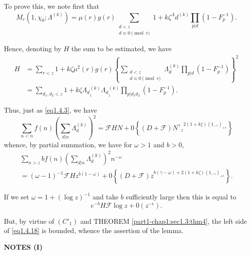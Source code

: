 To prove this, we note first that 
$$
M_r (1, \chi_0 ; \Lambda^{(k)}) = \mu (r) g (r)
\sum_{\substack{d < z \\ d \equiv 0 \pmod{r}}} 1+k \zeta
^{\Lambda}d ^{(k)} \prod_{p|d} (1-F_p ^{-1}). 
$$

Hence, denoting by $H$ the sum to be estimated, we have
\begin{align*}
  H & = \sum_{r < z} 1+k \zeta \mu^2 (r) g (r) \left\{
  \sum_{\substack{d < z \\ d \equiv 0 \pmod{r}}} \Lambda^{(k)}_d
  \prod_{p|d} (1-F_p^{-1})\right\}^2\\ 
  &= \sum_{d_1,d_2 < z} 1+k \zeta \Lambda{_d}_{_1}^{(k)}
  \Lambda{_d}_{_1}^{(k)} \prod_{p|d_1d_2} (1-F_p^{-1}). 
\end{align*}\pageoriginale

Thus, just as \eqref{eq1.4.3}, we have
$$
\sum_{n < n} f(n) \left(\sum_{d|n} \Lambda_d^{(k)}\right)^2 = \mathscr{F} HN + 0
\left\{ (D+\mathscr{F}) N^\gamma{_z}^{2 (1+k \zeta)
  (1_{-\gamma})_{+\epsilon }}\right\} 
$$
whence, by partial summation, we have for $\omega > 1$ and $ b > 0 $,
\begin{multline*}
  \sum_{n > z}b f(n) \left(\sum_{d|n} \Lambda_d^{(k)}\right)^2 n ^{-\omega}\\
  = (\omega-1) ^{-1} \mathscr{F} Hz^{b(1-\omega)} + 0 \left\{ (D +
  \mathscr{F}) z^{b (\gamma-\omega) + 2 (1+k \zeta) (1_{-\gamma}) _{+
      \epsilon }}\right\}. \tag{1.4.18} \label{eq1.4.18}
\end{multline*}

If we set $\omega = 1 + (\log z)^{-1}$ and take $b$ sufficiently large
then this is equal to  
$$
e ^{-b} H \mathscr{F} \log z + 0(z^{- \epsilon }).
$$

But, by virtue of $(C'_1)$ and THEOREM \ref{part1-chap1:sec1.3:thm4},
the left side of 
\eqref{eq1.4.18} is bounded, whence the assertion of the lemma. 

\medskip
\begin{center} 
 \textbf{NOTES (I)}
\end{center}

